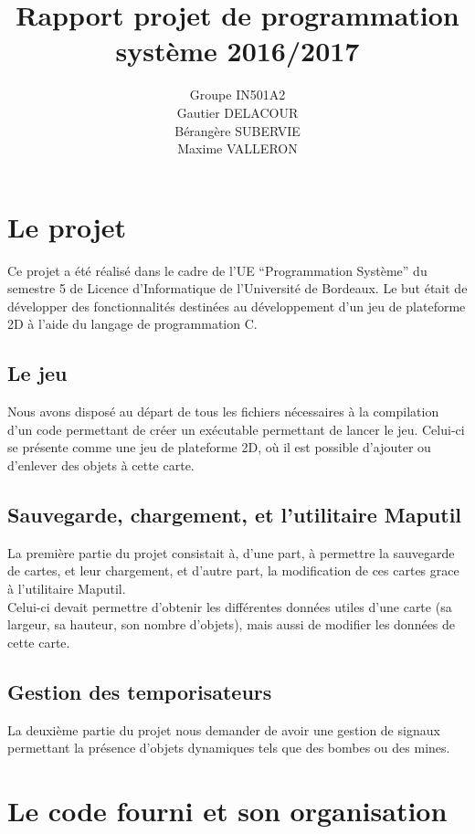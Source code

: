 \documentclass{report}
\title{Rapport projet de programmation système 2016/2017}
\author{Groupe IN501A2\\Gautier DELACOUR\\Bérangère SUBERVIE\\Maxime VALLERON}
\begin{document}
\maketitle
\tableofcontents

\chapter{Le projet}
Ce projet a été réalisé dans le cadre de l'UE ``Programmation Système'' du semestre 5 de Licence d'Informatique de l'Université de Bordeaux. Le but était de développer des fonctionnalités destinées au développement d'un jeu de plateforme 2D à l'aide du langage de programmation C.

\section{Le jeu}
Nous avons disposé au départ de tous les fichiers nécessaires à la compilation d'un code permettant de créer un exécutable permettant de lancer le jeu. Celui-ci se présente comme une jeu de plateforme 2D, où il est possible d'ajouter ou d'enlever des objets à cette carte.

\section{Sauvegarde, chargement, et l'utilitaire Maputil}
La première partie du projet consistait à, d'une part, à permettre la sauvegarde de cartes, et leur chargement, et d'autre part, la modification de ces cartes grace à l'utilitaire Maputil.\\
Celui-ci devait permettre d'obtenir les différentes données utiles d'une carte (sa largeur, sa hauteur, son nombre d'objets), mais aussi de modifier les données de cette carte.

\section{Gestion des temporisateurs}
La deuxième partie du projet nous demander de avoir une gestion de signaux permettant la présence d'objets dynamiques tels que des bombes ou des mines.


\chapter{Le code fourni et son organisation}
\setcounter{section}{0}
\end{document}
